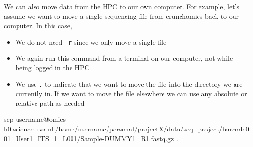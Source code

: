 \documentclass[
  letterpaper,
  DIV=11,
  numbers=noendperiod]{scrreprt}
\newenvironment{Shaded}{}{}
\newcommand{\FunctionTok}[1]{\textcolor[rgb]{0.44,0.26,0.76}{#1}}
\newcommand{\NormalTok}[1]{\textcolor[rgb]{0.14,0.16,0.18}{#1}}
\providecommand{\tightlist}{%
  \setlength{\itemsep}{0pt}\setlength{\parskip}{0pt}}\usepackage{longtable,booktabs,array}
\begin{document}
\begin{tcolorbox}[enhanced jigsaw, colframe=quarto-callout-tip-color-frame, title=\textcolor{quarto-callout-tip-color}{\faLightbulb}\hspace{0.5em}{Tip: Moving data from the HPC to our own computer}, titlerule=0mm, toptitle=1mm, left=2mm, colbacktitle=quarto-callout-tip-color!10!white, bottomtitle=1mm, coltitle=black, breakable, colback=white, arc=.35mm, bottomrule=.15mm, rightrule=.15mm, leftrule=.75mm, opacityback=0, toprule=.15mm, opacitybacktitle=0.6]

We can also move data from the HPC to our own computer. For example,
let's assume we want to move a single sequencing file from crunchomics
back to our computer. In this case,

\begin{itemize}
\tightlist
\item
  We do not need \texttt{-r} since we only move a single file
\item
  We again run this command from a terminal on our computer, not while
  being logged in the HPC
\item
  We use \texttt{.} to indicate that we want to move the file into the
  directory we are currently in. If we want to move the file elsewhere
  we can use any absolute or relative path as needed
\end{itemize}

\begin{Shaded}
\begin{Highlighting}[]
\FunctionTok{scp}\NormalTok{ username@omics{-}h0.science.uva.nl:/home/username/personal/projectX/data/seq\_project/barcode001\_User1\_ITS\_1\_L001/Sample{-}DUMMY1\_R1.fastq.gz .}
\end{Highlighting}
\end{Shaded}

\end{tcolorbox}
\end{document}
